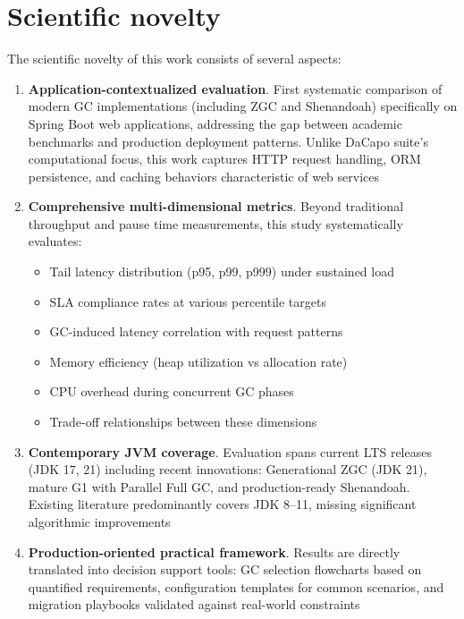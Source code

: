 \section{Scientific novelty}
\label{sec:novelty}

The scientific novelty of this work consists of several aspects:

\begin{enumerate}
    \item \textbf{Application-contextualized evaluation}. First systematic comparison of modern GC implementations (including ZGC and Shenandoah) specifically on Spring Boot web applications, addressing the gap between academic benchmarks and production deployment patterns. Unlike DaCapo suite's computational focus, this work captures HTTP request handling, ORM persistence, and caching behaviors characteristic of web services
    
    \item \textbf{Comprehensive multi-dimensional metrics}. Beyond traditional throughput and pause time measurements, this study systematically evaluates:
    \begin{itemize}
        \item Tail latency distribution (p95, p99, p999) under sustained load
        \item SLA compliance rates at various percentile targets
        \item GC-induced latency correlation with request patterns
        \item Memory efficiency (heap utilization vs allocation rate)
        \item CPU overhead during concurrent GC phases
        \item Trade-off relationships between these dimensions
    \end{itemize}
    
    \item \textbf{Contemporary JVM coverage}. Evaluation spans current LTS releases (JDK 17, 21) including recent innovations: Generational ZGC (JDK 21), mature G1 with Parallel Full GC, and production-ready Shenandoah. Existing literature predominantly covers JDK 8--11, missing significant algorithmic improvements
    
    \item \textbf{Production-oriented practical framework}. Results are directly translated into decision support tools: GC selection flowcharts based on quantified requirements, configuration templates for common scenarios, and migration playbooks validated against real-world constraints
\end{enumerate}

